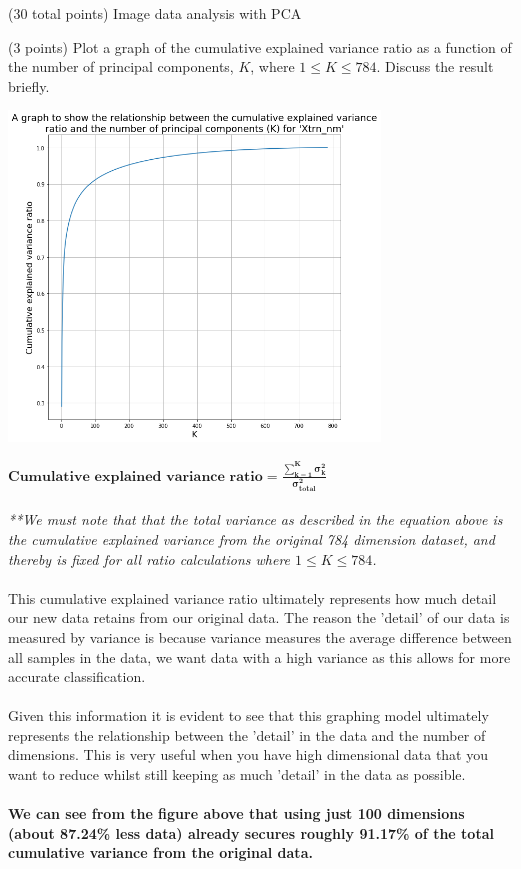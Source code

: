 \documentclass[12pt]{article}
\begin{document}
\begin{question}{(30 total points) Image data analysis with PCA}
\begin{subquestion}{(3 points)
       Plot a graph of the cumulative explained variance ratio as a function of the number of principal components, $K$, where $1\le K \le 784$.
       Discuss the result briefly.
     }
      \begin{answerbox}{54em}
        \begin{center}
         \includegraphics[width=0.74\textwidth]{images/q14.png}
        \end{center}
        \footnotesize{
        $\mathbf{Cumulative}$ $\mathbf{explained}$ $\mathbf{variance}$ $\mathbf{ratio = \frac{\sum_{k=1}^{K}\sigma_{k}^{2}}{\sigma_{total}^{2}}}$\\ 
\\
        \emph{**We must note that that the total variance as described in the equation above is the cumulative explained variance from the original 784 dimension dataset, and thereby is fixed for all ratio calculations where $1 \leq K \leq 784$.}\\
\\
        This cumulative explained variance ratio ultimately represents how much detail our new data retains from our original data. The reason the 'detail' of our data is measured by variance is because variance measures the average difference between all samples in the data, we want data with a high variance as this allows for more accurate classification.\\
\\
        Given this information it is evident to see that this graphing model ultimately represents the relationship between the 'detail' in the data and the number of dimensions. This is very useful when you have high dimensional data that you want to reduce whilst still keeping as much 'detail' in the data as possible.\\
\\
        \textbf{We can see from the figure above that using just 100 dimensions (about 87.24\% less data) already secures roughly 91.17\% of the total cumulative variance from the original data.}\\
}
\end{answerbox}
\end{subquestion}
\end{question}
\end{document}
